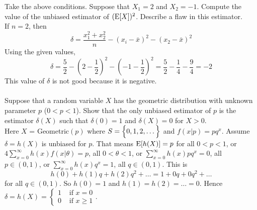 \documentclass[12pt]{article}
\begin{document}
Take the above conditions. Suppose that $X_1 = 2$ and $X_2 = -1$. Compute the value of the unbiased estimator of $(\mathrm{E}[ X ])^2$. Describe a flaw in this estimator. \\ 
If $n=2$, then $$\delta = \frac{x_1^2 + x_2^2}{n} - (x_i - \bar{x})^2 - (x_2 - \bar{x})^2$$ Using the given values, $$ \delta = \frac{5}{2} - (2- \frac{1}{2})^2 - (-1 - \frac{1}{2})^2 = \frac{5}{2} - \frac{1}{4} - \frac{9}{4} = -2 $$ 
This value of $\delta$ is not good because it is negative. \\~\\

Suppose that a random variable $X$ has the geometric distribution with unknown parameter $p$ ($0 < p < 1$). Show that the only unbiased estimator of $p$ is the estimator $\delta(X)$ such that $\delta(0) = 1$ and $\delta(X) = 0$ for $X > 0$. \\ 
Here $X$ = Geometric$(p)$ where $S = \Big\{ 0,1,2,\dots \Big\}$ and $f(x | p) = pq^x$. Assume $\delta = h(X)$ is unbiased for $p$. That means $\mathrm{E}[ h(X) ] = p$ for all $0 < p < 1$, or $4\sum_{x=0}^\infty h(x)f(x | \theta) = p$, all $0 < \theta < 1$, or $\sum_{x=0}^\infty h(x)pq^x = 0$, all $p \in (0,1)$, or $\sum_{x=0}^\infty h(x)q^x = 1$, all $q \in (0,1)$. This is $$h(0) + h(1)q + h(2)q^2 + \dots = 1 + 0q + 0q^2 + \dots $$ for all $q \in (0,1)$. So $h(0) = 1$ and $h(1) = h(2) = \dots = 0$. Hence $\delta = h(X) = \begin{cases} 1 &\text{ if } x = 0 \\ 0 &\text{ if } x \geq 1 \end{cases} $. 
\end{document}
